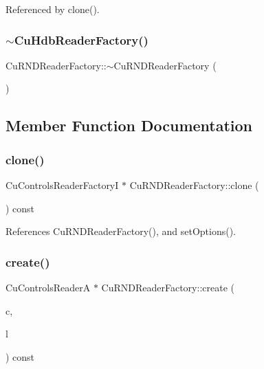 Referenced by clone().

\mbox{\label{classCuHdbReaderFactory_affac7dd792bd7bd3895a1546706821d0}} 
\subsubsection{$\sim$CuHdbReaderFactory()}
{\footnotesize\ttfamily Cu\+R\+N\+D\+Reader\+Factory\+::$\sim$\+Cu\+R\+N\+D\+Reader\+Factory (\begin{DoxyParamCaption}{ }\end{DoxyParamCaption})\hspace{0.3cm}{\ttfamily [virtual]}}



\subsection{Member Function Documentation}
\mbox{\label{classCuHdbReaderFactory_a67e0a82d5310e1dda931d0f0d1d70480}} 
\subsubsection{clone()}
{\footnotesize\ttfamily Cu\+Controls\+Reader\+FactoryI $\ast$ Cu\+R\+N\+D\+Reader\+Factory\+::clone (\begin{DoxyParamCaption}{ }\end{DoxyParamCaption}) const}



References Cu\+R\+N\+D\+Reader\+Factory(), and set\+Options().

\mbox{\label{classCuHdbReaderFactory_a14bff709296dbbfe9cf17472fb06d70e}} 
\subsubsection{create()}
{\footnotesize\ttfamily Cu\+Controls\+ReaderA $\ast$ Cu\+R\+N\+D\+Reader\+Factory\+::create (\begin{DoxyParamCaption}\item[{Cumbia $\ast$}]{c,  }\item[{Cu\+Data\+Listener $\ast$}]{l }\end{DoxyParamCaption}) const}



